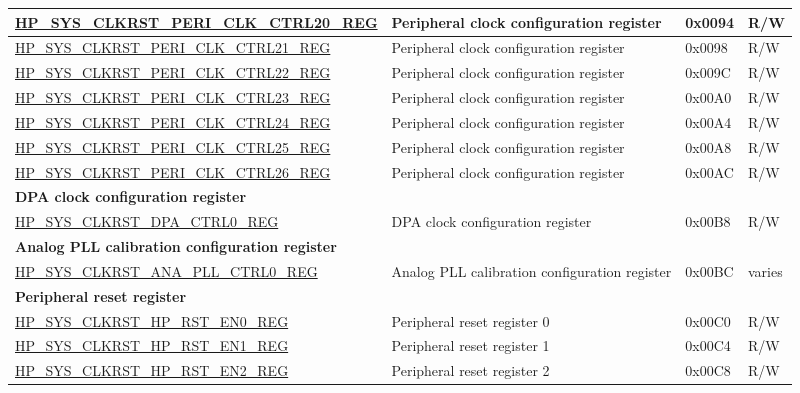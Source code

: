 \begin{longtable}{ | p{7.5cm} | p{6.2cm} | p{1.3cm} | p{1cm} | }
\hyperref[regdesc:HPSYSCLKRSTPERICLKCTRL20REG]{HP\_SYS\_CLKRST\_PERI\_CLK\_CTRL20\_REG} & Peripheral clock configuration register  & 0x0094 & R/W \\ \hline
\hyperref[regdesc:HPSYSCLKRSTPERICLKCTRL21REG]{HP\_SYS\_CLKRST\_PERI\_CLK\_CTRL21\_REG} & Peripheral clock configuration register  & 0x0098 & R/W \\ \hline
\hyperref[regdesc:HPSYSCLKRSTPERICLKCTRL22REG]{HP\_SYS\_CLKRST\_PERI\_CLK\_CTRL22\_REG} & Peripheral clock configuration register  & 0x009C & R/W \\ \hline
\hyperref[regdesc:HPSYSCLKRSTPERICLKCTRL23REG]{HP\_SYS\_CLKRST\_PERI\_CLK\_CTRL23\_REG} & Peripheral clock configuration register  & 0x00A0 & R/W \\ \hline
\hyperref[regdesc:HPSYSCLKRSTPERICLKCTRL24REG]{HP\_SYS\_CLKRST\_PERI\_CLK\_CTRL24\_REG} & Peripheral clock configuration register  & 0x00A4 & R/W \\ \hline
\hyperref[regdesc:HPSYSCLKRSTPERICLKCTRL25REG]{HP\_SYS\_CLKRST\_PERI\_CLK\_CTRL25\_REG} & Peripheral clock configuration register  & 0x00A8 & R/W \\ \hline
\hyperref[regdesc:HPSYSCLKRSTPERICLKCTRL26REG]{HP\_SYS\_CLKRST\_PERI\_CLK\_CTRL26\_REG} & Peripheral clock configuration register  & 0x00AC & R/W \\ \hline
\multicolumn{4}{|l|}{\textbf{DPA clock configuration register}} \\ \hline
\hyperref[regdesc:HPSYSCLKRSTDPACTRL0REG]{HP\_SYS\_CLKRST\_DPA\_CTRL0\_REG} & DPA clock configuration register & 0x00B8 & R/W \\ \hline
\multicolumn{4}{|l|}{\textbf{Analog PLL calibration configuration register}} \\ \hline
\hyperref[regdesc:HPSYSCLKRSTANAPLLCTRL0REG]{HP\_SYS\_CLKRST\_ANA\_PLL\_CTRL0\_REG} & Analog PLL calibration configuration register & 0x00BC & varies \\ \hline
\multicolumn{4}{|l|}{\textbf{Peripheral reset register}} \\ \hline
\hyperref[regdesc:HPSYSCLKRSTHPRSTEN0REG]{HP\_SYS\_CLKRST\_HP\_RST\_EN0\_REG} & Peripheral reset register 0 & 0x00C0 & R/W \\ \hline
\hyperref[regdesc:HPSYSCLKRSTHPRSTEN1REG]{HP\_SYS\_CLKRST\_HP\_RST\_EN1\_REG} & Peripheral reset register 1 & 0x00C4 & R/W \\ \hline
\hyperref[regdesc:HPSYSCLKRSTHPRSTEN2REG]{HP\_SYS\_CLKRST\_HP\_RST\_EN2\_REG} & Peripheral reset register 2 & 0x00C8 & R/W \\ \hline

\end{longtable}
